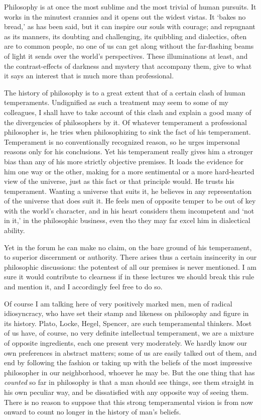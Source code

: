 \documentclass[]{article}
\begin{document}
Philosophy is at once the most sublime and the most trivial of human
pursuits. It works in the minutest crannies and it opens out the widest
vistas. It `bakes no bread,' as has been said, but it can inspire our
souls with courage; and repugnant as its manners, its doubting and
challenging, its quibbling and dialectics, often are to common people,
no one of us can get along without the far-flashing beams of light it
sends over the world's perspectives. These illuminations at least, and
the contrast-effects of darkness and mystery that accompany them, give
to what it says an interest that is much more than professional.

The history of philosophy is to a great extent that of a certain clash
of human temperaments. Undignified as such a treatment may seem to some
of my colleagues, I shall have to take account of this clash and explain
a good many of the divergencies of philosophers by it. Of whatever
temperament a professional philosopher is, he tries when philosophizing
to sink the fact of his temperament. Temperament is no conventionally
recognized reason, so he urges impersonal reasons only for his
conclusions. Yet his temperament really gives him a stronger bias than
any of his more strictly objective premises. It loads the evidence
for him one way or the other, making for a more sentimental or a more
hard-hearted view of the universe, just as this fact or that principle
would. He trusts his temperament. Wanting a universe that suits it, he
believes in any representation of the universe that does suit it.
He feels men of opposite temper to be out of key with the world's
character, and in his heart considers them incompetent and `not in
it,' in the philosophic business, even tho they may far excel him in
dialectical ability.

Yet in the forum he can make no claim, on the bare ground of his
temperament, to superior discernment or authority. There arises thus a
certain insincerity in our philosophic discussions: the potentest of
all our premises is never mentioned. I am sure it would contribute to
clearness if in these lectures we should break this rule and mention it,
and I accordingly feel free to do so.

Of course I am talking here of very positively marked men, men
of radical idiosyncracy, who have set their stamp and likeness on
philosophy and figure in its history. Plato, Locke, Hegel, Spencer,
are such temperamental thinkers. Most of us have, of course, no
very definite intellectual temperament, we are a mixture of opposite
ingredients, each one present very moderately. We hardly know our own
preferences in abstract matters; some of us are easily talked out of
them, and end by following the fashion or taking up with the beliefs of
the most impressive philosopher in our neighborhood, whoever he may be.
But the one thing that has \emph{counted} so far in philosophy is that a man
should see things, see them straight in his own peculiar way, and be
dissatisfied with any opposite way of seeing them. There is no reason
to suppose that this strong temperamental vision is from now onward to
count no longer in the history of man's beliefs.
\end{document}
